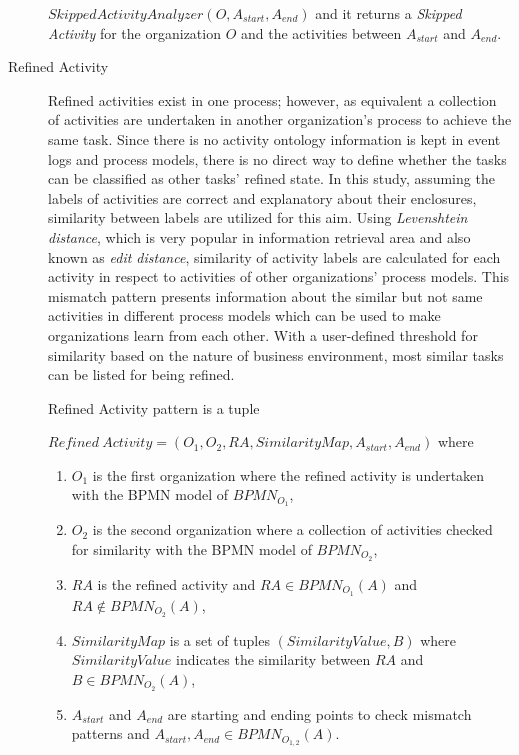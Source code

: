 \begin{description}
\begin{definition}
		$SkippedActivityAnalyzer(O, A_{start}, A_{end})$ and it returns a \textit{Skipped Activity} for the organization $O$ and the activities between $A_{start}$ and $A_{end}$.
		\end{definition}
  \item[Refined Activity] Refined activities exist in one process; however, as equivalent a collection of activities are undertaken in another organization's process to achieve the same task. Since there is no activity ontology information is kept in event logs and process models, there is no direct way to define whether the tasks can be classified as other tasks' refined state. In this study, assuming the labels of activities are correct and explanatory about their enclosures, similarity between labels are utilized for this aim. Using \textit{Levenshtein distance}, which is very popular in information retrieval area and also known as \textit{edit distance}, similarity of activity labels are calculated for each activity in respect to activities of other organizations' process models. This mismatch pattern presents information about the similar but not same activities in different process models which can be used to make organizations learn from each other. With a user-defined threshold for similarity based on the nature of business environment, most similar tasks can be listed for being refined.
		\theoremstyle{definition}
		\begin{definition}
		Refined Activity pattern is a tuple 

		${Refined\ Activity} = (O_{1}, O_{2}, RA, SimilarityMap, A_{start}, A_{end}) $ where 
		\begin{enumerate}
		  \item $O_{1}$ is the first organization where the refined activity is undertaken with the BPMN model of $BPMN_{{O}_{1}}$,
		  \item $O_{2}$ is the second organization where a collection of activities checked for similarity with the BPMN model of $BPMN_{{O}_{2}}$,
		  \item $RA$ is the refined activity and $RA \in BPMN_{{O}_{1}}(A)$ and $RA \notin BPMN_{{O}_{2}}(A)$,
		  \item $SimilarityMap$ is a set of tuples $(SimilarityValue, B)$ where $SimilarityValue$ indicates the similarity between $RA$ and $B \in BPMN_{{O}_{2}}(A)$, 
 		  \item $A_{start}$ and $A_{end}$ are starting and ending points to check mismatch patterns and $A_{start}, A_{end} \in BPMN_{{O}_{1,2}}(A)$. 
		\end{enumerate}
		\end{definition}


\end{description}
